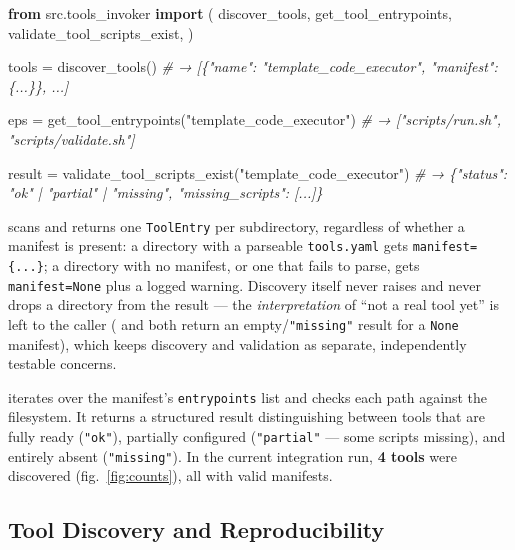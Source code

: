 \documentclass[
]{article}
\newenvironment{Shaded}{}{}
\newcommand{\CommentTok}[1]{\textcolor[rgb]{0.38,0.63,0.69}{\textit{#1}}}
\newcommand{\ImportTok}[1]{\textcolor[rgb]{0.00,0.50,0.00}{\textbf{#1}}}
\newcommand{\NormalTok}[1]{#1}
\newcommand{\OperatorTok}[1]{\textcolor[rgb]{0.40,0.40,0.40}{#1}}
\newcommand{\StringTok}[1]{\textcolor[rgb]{0.25,0.44,0.63}{#1}}
\begin{document}
\begin{Shaded}
\begin{Highlighting}[]
\ImportTok{from}\NormalTok{ src.tools\_invoker }\ImportTok{import}\NormalTok{ (}
\NormalTok{    discover\_tools,}
\NormalTok{    get\_tool\_entrypoints,}
\NormalTok{    validate\_tool\_scripts\_exist,}
\NormalTok{)}

\NormalTok{tools }\OperatorTok{=}\NormalTok{ discover\_tools()}
\CommentTok{\# → [\{"name": "template\_code\_executor", "manifest": \{...\}\}, ...]}

\NormalTok{eps }\OperatorTok{=}\NormalTok{ get\_tool\_entrypoints(}\StringTok{"template\_code\_executor"}\NormalTok{)}
\CommentTok{\# → ["scripts/run.sh", "scripts/validate.sh"]}

\NormalTok{result }\OperatorTok{=}\NormalTok{ validate\_tool\_scripts\_exist(}\StringTok{"template\_code\_executor"}\NormalTok{)}
\CommentTok{\# → \{"status": "ok" | "partial" | "missing", "missing\_scripts": [...]\}}
\end{Highlighting}
\end{Shaded}

 scans  and returns
one \texttt{ToolEntry} per subdirectory, regardless of whether a
manifest is present: a directory with a parseable \texttt{tools.yaml}
gets \texttt{manifest=\{...\}}; a directory with no manifest, or one
that fails to parse, gets \texttt{manifest=None} plus a logged warning.
Discovery itself never raises and never drops a directory from the
result --- the \emph{interpretation} of ``not a real tool yet'' is left
to the caller ( and
 both return an
empty/\texttt{"missing"} result for a \texttt{None} manifest), which
keeps discovery and validation as separate, independently testable
concerns.

 iterates over the manifest's
\texttt{entrypoints} list and checks each path against the filesystem.
It returns a structured result distinguishing between tools that are
fully ready (\texttt{"ok"}), partially configured (\texttt{"partial"}
--- some scripts missing), and entirely absent (\texttt{"missing"}). In
the current integration run, \textbf{4 tools} were discovered
(fig.~\ref{fig:counts}), all with valid manifests.

\subsection{Tool Discovery and
Reproducibility}\label{tool-discovery-and-reproducibility}
\end{document}
